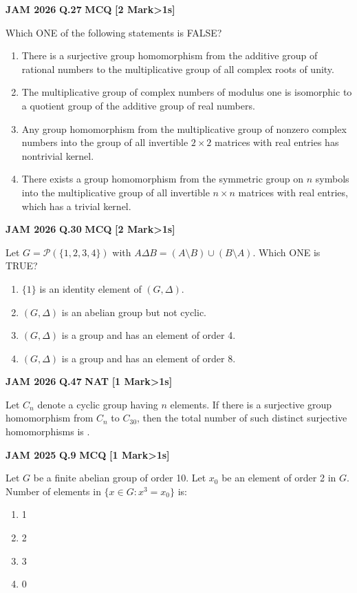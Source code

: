 \documentclass[11pt,a4paper]{article}
\newcommand{\pyqheader}[4]{%
    \noindent\begin{tcolorbox}[
        colback=badgebg,
        colframe=secondary,
        arc=2mm,
        boxrule=0.6pt,
        top=1.5mm,bottom=1.5mm,left=2mm,right=2mm
    ]
        \textbf{\textcolor{primary}{JAM #1}} \hfill \textbf{Q.#2} \hfill \textsc{\textbf{#3}} \hfill \textbf{[#4 Mark\ifnum#4>1s\fi]}
    \end{tcolorbox}\vspace{-1mm}
}
\begin{document}
\pyqheader{2026}{27}{MCQ}{2}
Which ONE of the following statements is FALSE?
\begin{enumerate}[label=(\Alph*)]
    \item There is a surjective group homomorphism from the additive group of rational numbers to the multiplicative group of all complex roots of unity.
    \item The multiplicative group of complex numbers of modulus one is isomorphic to a quotient group of the additive group of real numbers.
    \item Any group homomorphism from the multiplicative group of nonzero complex numbers into the group of all invertible $2\times 2$ matrices with real entries has nontrivial kernel.
    \item There exists a group homomorphism from the symmetric group on $n$ symbols into the multiplicative group of all invertible $n\times n$ matrices with real entries, which has a trivial kernel.
\end{enumerate}

\pyqheader{2026}{30}{MCQ}{2}
Let $G=\mathcal{P}(\{1,2,3,4\})$ with $A\Delta B=(A\setminus B)\cup(B\setminus A)$. Which ONE is TRUE?
\begin{enumerate}[label=(\Alph*)]
    \item $\{1\}$ is an identity element of $(G,\Delta)$.
    \item $(G,\Delta)$ is an abelian group but not cyclic.
    \item $(G,\Delta)$ is a group and has an element of order 4.
    \item $(G,\Delta)$ is a group and has an element of order 8.
\end{enumerate}

\pyqheader{2026}{47}{NAT}{1}
Let $C_n$ denote a cyclic group having $n$ elements. If there is a surjective group homomorphism from $C_n$ to $C_{30}$, then the total number of such distinct surjective homomorphisms is \underline{\hspace{1.5cm}}.

\pyqheader{2025}{9}{MCQ}{1}
Let $G$ be a finite abelian group of order 10. Let $x_{0}$ be an element of order 2 in $G$. Number of elements in $\{x\in G: x^{3}=x_{0}\}$ is:
\begin{enumerate}[label=(\Alph*)]
    \item 1
    \item 2
    \item 3
    \item 0
\end{enumerate}
\end{document}
